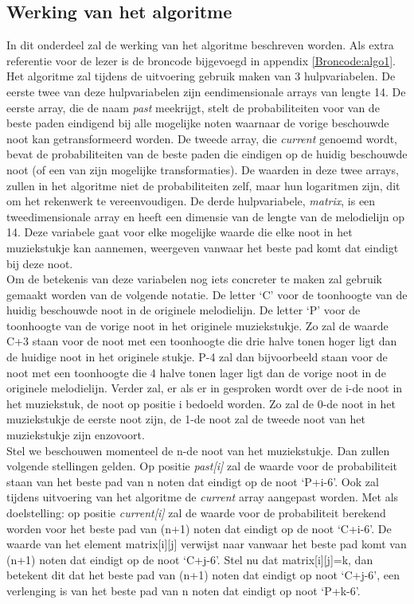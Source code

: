 \subsection{Werking van het algoritme}
In dit onderdeel zal de werking van het algoritme beschreven worden. Als extra referentie voor de lezer is de broncode bijgevoegd in appendix \ref{Broncode:algo1}.\\ 
Het algoritme zal tijdens de uitvoering gebruik maken van 3 hulpvariabelen. De eerste twee van deze hulpvariabelen zijn eendimensionale arrays van lengte 14. De eerste array, die de naam \textit{past} meekrijgt, stelt de probabiliteiten voor van de beste paden eindigend bij alle mogelijke noten waarnaar de vorige beschouwde noot kan getransformeerd worden. De tweede array, die \textit{current} genoemd wordt, bevat de probabiliteiten van de beste paden die eindigen op de huidig beschouwde noot (of een van zijn mogelijke transformaties). De waarden in deze twee arrays, zullen in het algoritme niet de probabiliteiten zelf, maar hun logaritmen zijn, dit om het rekenwerk te vereenvoudigen. De derde hulpvariabele, \textit{matrix}, is een tweedimensionale array en heeft een dimensie van de lengte van de melodielijn op 14. Deze variabele gaat voor elke mogelijke waarde die elke noot in het muziekstukje kan aannemen, weergeven vanwaar het beste pad komt dat eindigt bij deze noot.\\
Om de betekenis van deze variabelen nog iets concreter te maken zal gebruik gemaakt worden van de volgende notatie. De letter `C' voor de toonhoogte van de huidig beschouwde noot in de originele melodielijn. De letter `P' voor de toonhoogte van de vorige noot in het originele muziekstukje. Zo zal de waarde C+3 staan voor de noot met een toonhoogte die drie halve tonen hoger ligt dan de huidige noot in het originele stukje. P-4 zal dan bijvoorbeeld staan voor de noot met een toonhoogte die 4 halve tonen lager ligt dan de vorige noot in de originele melodielijn. Verder zal, er als er in gesproken wordt over de i-de noot in het muziekstuk, de noot op positie i bedoeld worden. Zo zal de 0-de noot in het muziekstukje de eerste noot zijn, de 1-de noot zal de tweede noot van het muziekstukje zijn enzovoort.\\ 
Stel we beschouwen momenteel de n-de noot van het muziekstukje. Dan zullen volgende stellingen gelden. Op positie \textit{past[i]} zal de waarde voor de probabiliteit staan van het beste pad van n noten dat eindigt op de noot `P+i-6'. Ook zal tijdens uitvoering van het algoritme de \textit{current} array aangepast worden. Met als doelstelling: op positie \textit{current[i]} zal de waarde voor de probabiliteit berekend worden voor het beste pad van (n+1) noten dat eindigt op de noot `C+i-6'. De waarde van het element matrix[i][j] verwijst naar vanwaar het beste pad komt van (n+1) noten dat eindigt op de noot `C+j-6'. Stel nu dat matrix[i][j]=k, dan betekent dit dat het beste pad van (n+1) noten dat eindigt op noot `C+j-6', een verlenging is van het beste pad van n noten dat eindigt op noot `P+k-6'. 

